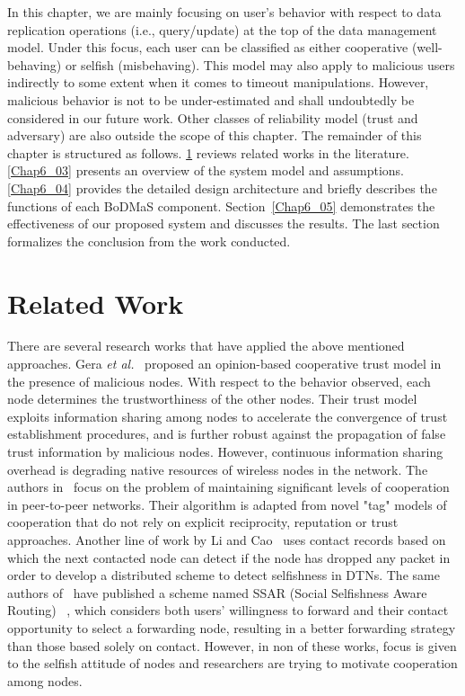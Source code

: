 In this chapter, we are mainly focusing on user's behavior with respect to data replication operations (i.e., query/update) at the top of the data management model. Under this focus, each user can be classified as either cooperative (well-behaving) or selfish (misbehaving). This model may also apply to malicious users indirectly to some extent when it comes to timeout manipulations. However, malicious behavior is not to be under-estimated and shall undoubtedly be considered in our future work. Other classes of reliability model (trust and adversary) are also outside the scope of this chapter. The remainder of this chapter is structured as follows. \ref{Chap6_02} reviews related works in the literature. \ref{Chap6_03} presents an overview of the system model and assumptions. \ref{Chap6_04} provides the detailed design architecture and briefly describes the functions of each BoDMaS component. Section~\ref{Chap6_05} demonstrates the effectiveness of our proposed system and discusses the results. The last section formalizes the conclusion from the work conducted.

\section{Related Work}\label{Chap6_02}
There are several research works that have applied the above mentioned approaches. Gera {\it et al.}~\cite{PGera2011} proposed an opinion-based cooperative trust model in the presence of malicious nodes. With respect to the behavior observed, each node determines the trustworthiness of the other nodes. Their trust model exploits information sharing among nodes to accelerate the convergence of trust establishment procedures, and is further robust against the propagation of false trust information by malicious nodes. However, continuous information sharing overhead is degrading native resources of wireless nodes in the network. The authors in~\cite{DHales2005} focus on the problem of maintaining significant levels of cooperation in peer-to-peer networks. Their algorithm is adapted from novel "tag" models of cooperation that do not rely on explicit reciprocity, reputation or trust approaches. Another line of work by Li and Cao~\cite{QLi2012} uses contact records based on which the next contacted node can detect if the node has dropped any packet in order to develop a distributed scheme to detect selfishness in DTNs. The same authors of~\cite{QLi2012} have published a scheme named SSAR (Social Selfishness Aware Routing) ~\cite{QLi2010}, which considers both users' willingness to forward and their contact opportunity to select a forwarding node, resulting in a better forwarding strategy than those based solely on contact. However, in non of these works, focus is given to the selfish attitude of nodes and researchers are trying to motivate cooperation among nodes.

